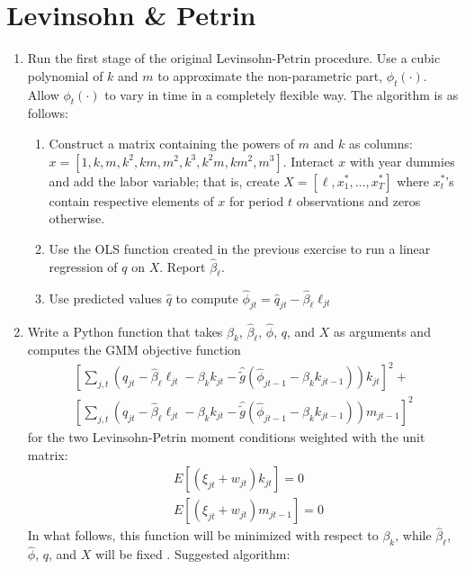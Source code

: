 \documentclass[a4paper, 11pt]{article}
\begin{document}
\section{Levinsohn \& Petrin}
\begin{enumerate}
	\item{Run the first stage of the original Levinsohn-Petrin procedure. Use a cubic polynomial of $k$ and $m$ to approximate the non-parametric part, $\phi_t(\cdot)$. Allow $\phi_t(\cdot)$ to vary in time in a completely flexible way. The algorithm is as follows:
	\begin{enumerate}
		\item{Construct a matrix containing the powers of $m$ and $k$ as columns:\\
		$x = [1, k, m, k^2, km, m^2, k^3, k^2m, km^2, m^3]$. Interact $x$ with year dummies and add the labor variable; that is, create $X = [\ell, x^*_1, \dots,x^*_T]$ where $x^*_t$'s contain respective elements of $x$ for period $t$ observations and zeros otherwise.}
		\item{Use the OLS function created in the previous exercise to run a linear regression of $q$ on $X$. Report $\widehat{\beta}_\ell$.}
		\item{Use predicted values $\widehat{q}$ to compute $\widehat{\phi}_{jt} = \widehat{q}_{jt} - \widehat{\beta}_\ell\ell_{jt}$}
	\end{enumerate}}
	\item{Write a Python function that takes $\beta_k$, $\widehat\beta_\ell$, $\widehat\phi$, $q$, and $X$ as arguments and computes the GMM objective function 
	\begin{multline}\label{gmmobj}
		\left[\sum_{j,t}\left(q_{jt} - \widehat{\beta}_\ell\ell_{jt} - \beta_kk_{jt} - \widehat{\widetilde{g}}(\widehat{\phi}_{jt-1} - \beta_kk_{jt-1})\right)k_{jt}\right]^2 + \\
		\left[\sum_{j,t}\left(q_{jt} - \widehat{\beta}_\ell\ell_{jt} - \beta_kk_{jt} - \widehat{\widetilde{g}}(\widehat{\phi}_{jt-1} - \beta_kk_{jt-1})\right)m_{jt-1}\right]^2
	\end{multline}
	for the two Levinsohn-Petrin moment conditions weighted with the unit matrix:
	\begin{align*}
		&E[(\xi_{jt} + w_{jt})k_{jt}] = 0\\
		&E[(\xi_{jt} + w_{jt})m_{jt-1}] = 0
	\end{align*}
	In what follows, this function will be minimized with respect to $\beta_k$, while $\widehat\beta_\ell$, $\widehat\phi$, $q$, and $X$ will be fixed . Suggested algorithm:
}
\end{enumerate}
\end{document}
